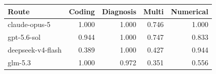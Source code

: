 \begin{tabular}{lrrrr}
\toprule
Route & Coding & Diagnosis & Multi & Numerical \\
\midrule
claude-opus-5 & 1.000 & 1.000 & 0.746 & 1.000 \\
gpt-5.6-sol & 0.944 & 1.000 & 0.747 & 0.833 \\
deepseek-v4-flash & 0.389 & 1.000 & 0.427 & 0.944 \\
glm-5.3 & 1.000 & 0.972 & 0.351 & 0.556 \\
\bottomrule
\end{tabular}
